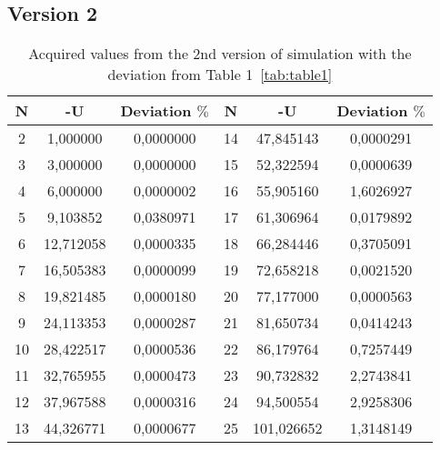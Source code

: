 \documentclass{scrartcl}
\begin{document}
\newpage
\subsection{Version 2}

\begin{table} [h] \label{tab:table3}
    \centering
 
    \begin{tabular}{|c|c|c|c|c|c|}
    \hline
   N      &  -U        &  Deviation $\%$ &  N   &  -U   &  Deviation $\%$\\
   \hline
    2     &  1,000000  &  0,0000000  &14  &  47,845143 & 0,0000291\\
    3     &  3,000000  &  0,0000000  &15  &  52,322594 & 0,0000639\\
    4     &  6,000000  &  0,0000002  &16  &  55,905160 & 1,6026927\\
    5     &  9,103852  &  0,0380971  &17  &  61,306964 & 0,0179892\\
    6     &  12,712058 &  0,0000335  &18  &  66,284446 & 0,3705091\\
    7     &  16,505383 &  0,0000099  &19  &  72,658218 & 0,0021520\\
    8     &  19,821485 &  0,0000180  &20  &  77,177000 & 0,0000563\\
    9     &  24,113353 &  0,0000287  &21  &  81,650734 & 0,0414243\\
    10    &  28,422517 &  0,0000536  &22  &  86,179764 & 0,7257449\\
    11    &  32,765955 &  0,0000473  &23  &  90,732832 & 2,2743841\\
    12    &  37,967588 &  0,0000316  &24  &  94,500554 & 2,9258306\\
    13    &  44,326771 &  0,0000677  &25  &  101,026652 & 1,3148149\\      
    \hline           
    \end{tabular}
    \caption{Acquired values from the 2nd version of simulation with the deviation from Table 1~\ref{tab:table1}}
\end{table}
\end{document}
